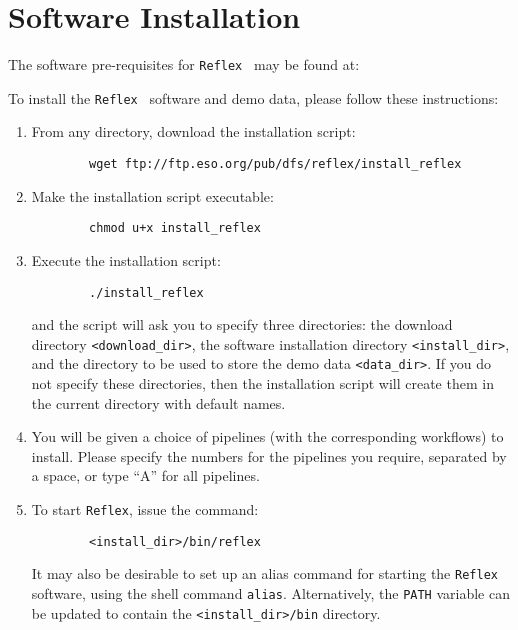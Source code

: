 \section{Software Installation}

The software pre-requisites for {\tt Reflex } may be found at:\newline

To install the {\tt Reflex } software and demo data, 
please follow these instructions:
\begin{enumerate}
  \item From any directory, download the installation script:
        {\small
        \begin{verbatim}
        wget ftp://ftp.eso.org/pub/dfs/reflex/install_reflex
        \end{verbatim}
        }

  \item Make the installation script executable:
        {\small
        \begin{verbatim}
        chmod u+x install_reflex
        \end{verbatim}
        }

  \item Execute the installation script:
        {\small
        \begin{verbatim}
        ./install_reflex
        \end{verbatim}
        }
        and the script will ask you to specify three directories: the download
        directory {\tt \verb|<|download\_dir\verb|>|}, the software
        installation directory {\tt \verb|<|install\_dir\verb|>|}, 
        and the directory to be used to store the demo data 
        {\tt \verb|<|data\_dir\verb|>|}.
        If you do not specify these directories, then the installation script 
        will create them in the current directory with default names.

  \item You will be given a choice of pipelines (with the corresponding 
        workflows) to install. Please specify the numbers for the pipelines 
        you require, separated by a space, or type ``A'' for all pipelines.

  \item To start {\tt Reflex}, issue the command:
        {\small
        \begin{verbatim}
        <install_dir>/bin/reflex
        \end{verbatim}
        }
        It may also be desirable to set up an alias command for starting the 
        {\tt Reflex} software, using the shell command {\tt alias}. 
        Alternatively, the {\tt PATH} variable can be updated to contain the
        {\tt \verb|<|install\_dir\verb|>|/bin} directory.
\end{enumerate}
